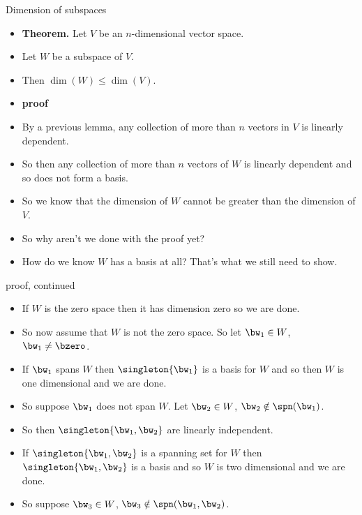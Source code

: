 \documentclass{beamer}
\begin{document}
\begin{frame}{Dimension of subspaces}

\begin{itemize}
\item \textbf{Theorem.} Let $V$ be an $n$-dimensional vector space.
\item Let $W$ be a subspace of $V$.
\item Then $\dim(W) \leq \dim(V)$.
\item \textbf{proof}
\item By a previous lemma, any collection of more than $n$ vectors in $V$ is linearly dependent.
\item So then any collection of more than $n$ vectors of $W$ is linearly dependent and so does not form a basis.
\item So we know that the dimension of $W$ cannot be greater than the dimension of $V$.
\item So why aren't we done with the proof yet?
\item How do we know $W$ has a basis at all? That's what we still need to show.
\end{itemize}
\end{frame}

\begin{frame}{proof, continued}

\begin{itemize}
\item If $W$ is the zero space then it has dimension zero so we are done.
\item So now assume that $W$ is not the zero space. So let $\bw_1\in W$, $\bw_1\not=\bzero$.
\item If $\bw_1$ spans $W$ then $\singleton{\bw_1}$ is a basis for $W$ and so then $W$ is one dimensional and we are done.
\item So suppose $\bw_1$ does not span $W$. Let $\bw_2\in W$, $\bw_2\notin\spn(\bw_1)$.
\item So then $\singleton{\bw_1,\bw_2}$ are linearly independent.
\item If $\singleton{\bw_1,\bw_2}$ is a spanning set for $W$ then  $\singleton{\bw_1,\bw_2}$ is a basis and
so $W$ is two dimensional and we are done.
\item So suppose $\bw_3\in W$, $\bw_3\notin\spn(\bw_1,\bw_2)$.
\end{itemize}

\end{frame}
\end{document}
